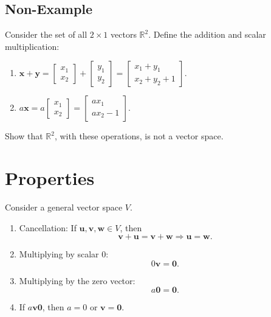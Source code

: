 \documentclass[20pt,a4paper]{extarticle}
\newcounter{example}
\begin{document}
\newpage

\phantom{2}

\newpage 

\phantom{2} 

\newpage 

\phantom{2} 

\newpage 

\subsection{Non-Example}

\begin{example}
Consider the set of all $2 \times 1$ vectors $\mathbb{R}^2$. Define the addition and scalar multiplication:
	\begin{enumerate}
		\item $\mathbf{x} + \mathbf{y} = \begin{bmatrix} x_1 \\ x_2 \end{bmatrix} + \begin{bmatrix} y_1 \\ y_2 \end{bmatrix} = \begin{bmatrix} x_1 + y_1 \\ x_2 + y_2 + 1 \end{bmatrix}$.
		\item $a \mathbf{x} = a \begin{bmatrix} x_1 \\ x_2 \end{bmatrix} = \begin{bmatrix} a x_1 \\ a x_2 - 1 \end{bmatrix}$. 
	\end{enumerate}
Show that $\mathbb{R}^2$, with these operations, is not a vector space.
\end{example}

\begin{solution}

\end{solution}

\newpage

\section{Properties}

Consider a general vector space $V$.

\begin{enumerate}[label=\Circled{\arabic*}]
	\item Cancellation: If $\mathbf{u}, \mathbf{v} , \mathbf{w} \in V$, then
		\[
			\mathbf{v} + \mathbf{u} = \mathbf{v} + \mathbf{w} \Longrightarrow \mathbf{u} = \mathbf{w} .
		\]
	\item Multiplying by scalar $0$: 
		\[
			0 \mathbf{v} = \mathbf{0}. 
		\]
	\item Multiplying by the zero vector:
		\[
			a \mathbf{0} = \mathbf{0} .
		\]
	\item If $a \mathbf{v} \mathbf{0}$, then $a = 0$ or $\mathbf{v} = \mathbf{0}$.
\end{enumerate}
\end{document}
